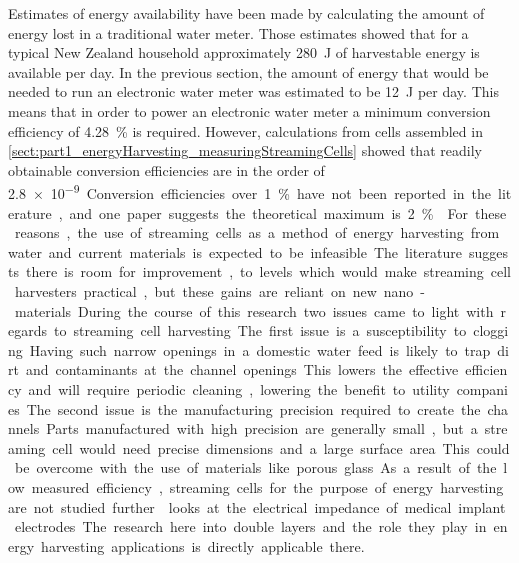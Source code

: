 
Estimates of energy availability have been made by calculating the amount of energy lost in a traditional water meter.
Those estimates showed that for a typical New Zealand household approximately \SI{280}{\joule} of harvestable energy is available per day.
In the previous section, the amount of energy that would be needed to run an electronic water meter was estimated to be \SI{12}{\joule} per day.
This means that in order to power an electronic water meter a minimum conversion efficiency of \SI{4.28}{\percent} is required.
However, calculations from cells assembled in \cref{sect:part1_energyHarvesting_measuringStreamingCells} showed that readily obtainable conversion efficiencies are in the order of \SI{2.8e-9}.
Conversion efficiencies over \SI{1}{\percent} have not been reported in the literature, and one paper suggests the theoretical maximum is \SI{2}{\percent} \cite{VanderHeyden2006}.
For these reasons, the use of streaming cells as a method of energy harvesting from water and current materials is expected to be infeasible.
The literature suggests there is room for improvement, to levels which would make streaming cell harvesters practical, but these gains are reliant on new nano-materials.

During the course of this research two issues came to light with regards to streaming cell harvesting.
The first issue is a susceptibility to clogging.
Having such narrow openings in a domestic water feed is likely to trap dirt and contaminants at the channel openings.
This lowers the effective efficiency and will require periodic cleaning, lowering the benefit to utility companies.
The second issue is the manufacturing precision required to create the channels.
Parts manufactured with high precision are generally small, but a streaming cell would need precise dimensions and a large surface area.
This could be overcome with the use of materials like porous glass.
As a result of the low measured efficiency, streaming cells for the purpose of energy harvesting are not studied further.
 looks at the electrical impedance of medical implant electrodes.
The research here into double layers and the role they play in energy harvesting applications is directly applicable there.

